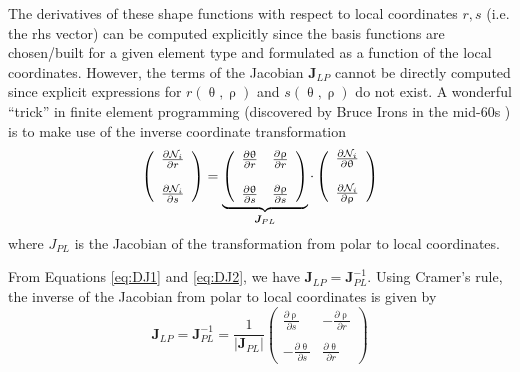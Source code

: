 The derivatives of these shape functions with respect to local coordinates $r,s$ (i.e. the rhs vector)
can be computed explicitly since the basis functions are chosen/built for a given element type and formulated
as a function of the local coordinates.
However, the terms of the Jacobian ${\bm J}_{LP}$ cannot be directly computed since 
explicit expressions for $r(\uptheta, \uprho)$ and $s(\uptheta, \uprho)$ do not exist.
A wonderful ``trick'' in finite element programming (discovered by Bruce Irons in the mid-60s \cite{eriz68}) is to make use of the inverse coordinate transformation
\begin{equation}
\left(
\begin{array}{c}
\frac{\partial {\mathcal{N}}_i}{\partial r} \\ \\
\frac{\partial {\mathcal{N}}_i}{\partial s} 
\end{array}
\right)
= 
\underbrace{\left(
\begin{array}{cc}
\frac{\partial \uptheta}{\partial r}  & 
\frac{\partial \uprho}{\partial r}  \\ \\
\frac{\partial \uptheta}{\partial s}  & 
\frac{\partial \uprho}{\partial s}
\end{array}
\right)}_{{\bm J}_{PL}}
\cdot
\left(
\begin{array}{c}
\frac{\partial {\mathcal{N}}_i}{\partial \uptheta} \\ \\
\frac{\partial {\mathcal{N}}_i}{\partial \uprho} 
\end{array}
\right)
\label{eq:DJ2}
\end{equation}
where $J_{PL}$ is the Jacobian of the transformation from polar to local coordinates.

From Equations \eqref{eq:DJ1} and \eqref{eq:DJ2}, we have ${\bm J}_{LP}={\bm J}_{PL}^{-1}$.
Using Cramer's rule, the inverse of the Jacobian from polar to local coordinates is given by
\[
{\bm J}_{LP}={\bm J}_{PL}^{-1} = \frac{1}{|{\bm J}_{PL}|} 
\left(
\begin{array}{cc}
\frac{\partial \uprho}{\partial s}  & 
-\frac{\partial \uprho}{\partial r}  \\ \\
-\frac{\partial \uptheta}{\partial s}  & 
\frac{\partial \uptheta}{\partial r}
\end{array}
\right)
\]


